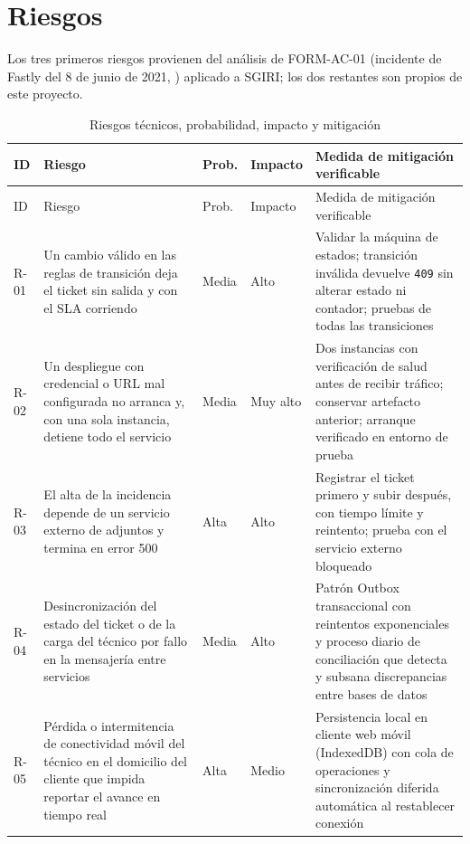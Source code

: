 \section{Riesgos}
\label{sec:riesgos}

Los tres primeros riesgos provienen del análisis de FORM-AC-01 (incidente de Fastly del 8 de junio
de 2021, \cite{fastly2021}) aplicado a SGIRI; los dos restantes son propios de este proyecto.

\begin{longtable}{@{}p{0.8cm} p{4.6cm} p{1.0cm} p{1.1cm} p{5.9cm}@{}}
\caption{Riesgos técnicos, probabilidad, impacto y mitigación}
\label{tab:riesgos}\\
\toprule
ID & Riesgo & Prob. & Impacto & Medida de mitigación verificable \\
\midrule
\endfirsthead
\toprule
ID & Riesgo & Prob. & Impacto & Medida de mitigación verificable \\
\midrule
\endhead
\bottomrule
\endfoot
R-01 & Un cambio válido en las reglas de transición deja el ticket sin salida y con el SLA
corriendo & Media & Alto & Validar la máquina de estados; transición inválida devuelve \texttt{409}
sin alterar estado ni contador; pruebas de todas las transiciones \\
\addlinespace
R-02 & Un despliegue con credencial o URL mal configurada no arranca y, con una sola instancia,
detiene todo el servicio & Media & Muy alto & Dos instancias con verificación de salud antes de
recibir tráfico; conservar artefacto anterior; arranque verificado en entorno de prueba \\
\addlinespace
R-03 & El alta de la incidencia depende de un servicio externo de adjuntos y termina en error 500 &
Alta & Alto & Registrar el ticket primero y subir después, con tiempo límite y reintento; prueba con
el servicio externo bloqueado \\
\addlinespace
R-04 & Desincronización del estado del ticket o de la carga del técnico por fallo en la mensajería
entre servicios & Media & Alto & Patrón Outbox transaccional con reintentos exponenciales y proceso
diario de conciliación que detecta y subsana discrepancias entre bases de datos \\
\addlinespace
R-05 & Pérdida o intermitencia de conectividad móvil del técnico en el domicilio del cliente que
impida reportar el avance en tiempo real & Alta & Medio & Persistencia local en cliente web móvil
(IndexedDB) con cola de operaciones y sincronización diferida automática al restablecer conexión \\
\end{longtable}
